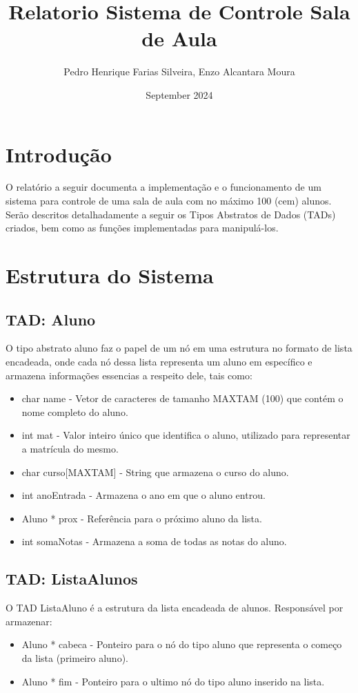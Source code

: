 \documentclass{article}
\title{Relatorio Sistema de Controle Sala de Aula}
\author{Pedro Henrique Farias Silveira, Enzo Alcantara Moura }
\date{September 2024}
\begin{document}
\maketitle

\section{Introdução}
O relatório a seguir documenta a implementação e o funcionamento de um sistema para controle de uma sala de aula com no máximo 100 (cem) alunos. Serão descritos detalhadamente a seguir os Tipos Abstratos de Dados (TADs) criados, bem como as funções implementadas para manipulá-los.

\section{Estrutura do Sistema}

\subsection{TAD: Aluno}
O tipo abstrato aluno faz o papel de um nó em uma estrutura no formato de lista encadeada, onde cada nó dessa lista representa um aluno em específico e armazena informações essencias a respeito dele, tais como:
\begin{itemize}
    \item char name - Vetor de caracteres de tamanho MAXTAM (100) que contém o nome completo do aluno.
    \item int mat - Valor inteiro único que identifica o aluno, utilizado para representar a matrícula do mesmo.
    \item char curso[MAXTAM] - String que armazena o curso do aluno.
    \item int anoEntrada - Armazena o ano em que o aluno entrou.
    \item Aluno * prox - Referência para o próximo aluno da lista.
    \item int somaNotas - Armazena a soma de todas as notas do aluno.
\end{itemize}

\subsection{TAD: ListaAlunos}
O TAD ListaAluno é a estrutura da lista encadeada de alunos. Responsável por armazenar:
\begin{itemize}
    \item Aluno * cabeca - Ponteiro para o nó do tipo aluno que representa o começo da lista (primeiro aluno).
    \item  Aluno * fim - Ponteiro para o ultimo nó do tipo aluno inserido na lista.
\end{itemize}
\end{document}
